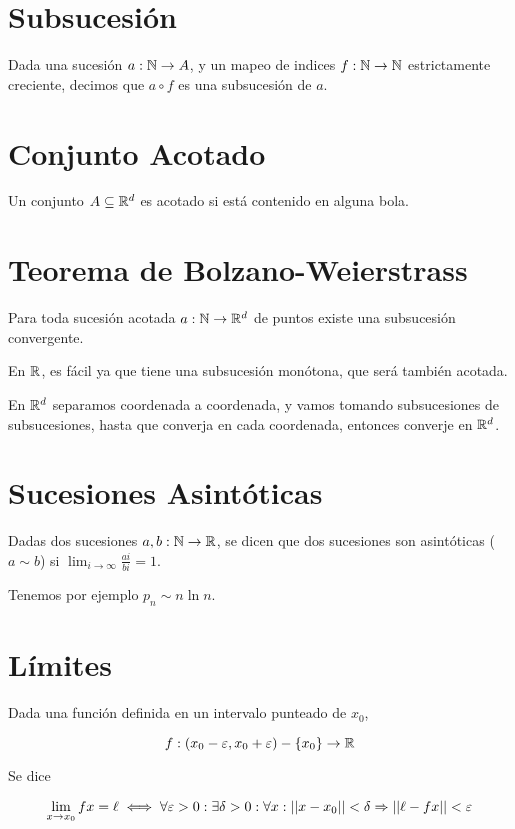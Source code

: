 \documentclass{article}
\begin{document}
\section{Subsucesión}
Dada una sucesión $a : \mathbb{N} \to A$, y un mapeo de indices $f : \mathbb{N} \to \mathbb{N}$
estrictamente creciente,
decimos que $a \circ f$ es una subsucesión de $a$.

\section{Conjunto Acotado}
Un conjunto $A \subseteq \mathbb{R}^d$ es acotado si está contenido en alguna bola.

\section{Teorema de Bolzano-Weierstrass}
Para toda sucesión acotada $a : \mathbb{N} \to \mathbb{R}^d$ de puntos existe una subsucesión convergente.

En $\mathbb{R}$, es fácil ya que tiene una subsucesión monótona, que será también acotada.

En $\mathbb{R}^d$ separamos coordenada a coordenada,
y vamos tomando subsucesiones de subsucesiones,
hasta que converja en cada coordenada, entonces converje en $\mathbb{R}^d$.

\section {Sucesiones Asintóticas}
Dadas dos sucesiones $a, b : \mathbb{N} \to \mathbb{R}$, se dicen que dos sucesiones son asintóticas
($a \sim b$) si $\lim_{i \to \infty} \frac{ai}{bi} = 1$.

Tenemos por ejemplo $p_n \sim n \ln n$.

\section{Límites}
Dada una función definida en un intervalo punteado de $x_0$,

\[f : (x_0 - \varepsilon, x_0 + \varepsilon) - \{x_0\} \to \mathbb{R}\]

Se dice 

\[\lim_{x \to x_0} f x = \ell \iff \forall \varepsilon > 0 : \exists \delta > 0
: \forall x : ||x - x_0|| < \delta \Rightarrow ||\ell - f x|| < \varepsilon\]
\end{document}
